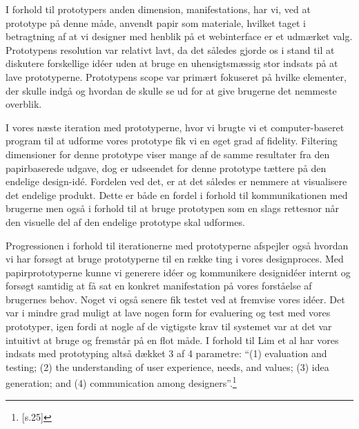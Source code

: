 I forhold til prototypers anden dimension, manifestations, har vi, ved at prototype på denne måde, anvendt papir som materiale, hvilket taget i betragtning af at vi designer med henblik på et webinterface er et udmærket valg. Prototypens resolution var relativt lavt, da det således gjorde os i stand til at diskutere forskellige idéer uden at bruge en uhensigtsmæssig stor indsats på at lave prototyperne. Prototypens scope var primært fokuseret på hvilke elementer, der skulle indgå og hvordan de skulle se ud for at give brugerne det nemmeste overblik.

I vores næste iteration med prototyperne, hvor vi brugte vi et computer-baseret program til at udforme vores prototype fik vi en øget grad af fidelity. Filtering dimensioner for denne prototype viser mange af de samme resultater fra den papirbaserede udgave, dog er udseendet for denne prototype tættere på den endelige design-idé. Fordelen ved det, er at det således er nemmere at visualisere det endelige produkt. Dette er både en fordel i forhold til kommunikationen med brugerne men også i forhold til at bruge prototypen som en slags rettesnor når den visuelle del af den endelige prototype skal udformes. 

Progressionen i forhold til iterationerne med prototyperne afspejler også hvordan vi har forsøgt at bruge prototyperne til en række ting i vores designproces. Med papirprototyperne kunne vi generere idéer og kommunikere designidéer internt og forsøgt samtidig at få sat en konkret manifestation på vores forståelse af brugernes behov. Noget vi også senere fik testet ved at fremvise vores idéer. Det var i mindre grad muligt at lave nogen form for evaluering og test med vores prototyper, igen fordi at nogle af de vigtigste krav til systemet var at det var intuitivt at bruge og fremstår på en flot måde. I forhold til Lim et al har vores indsats med prototyping altså dækket 3 af 4 parametre: “(1) evaluation and testing; (2) the understanding of user experience, needs, and values; (3) idea generation; and (4) communication among designers”.\footnote{\citep{Lim}[s.25]}
